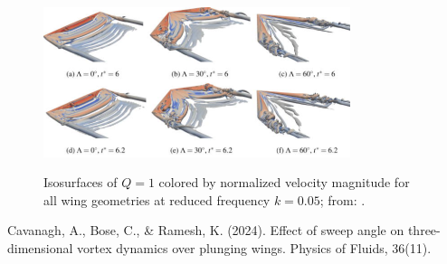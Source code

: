 \documentclass[a4paper,11pt]{article}
\begin{document}
	

\begin{figure}[h]
\centering
\includegraphics[width=0.8\textwidth]{./figure.png}
\label{fig}
\vspace{-0.5cm}
\caption{%
Isosurfaces of $Q = 1$ colored by normalized velocity magnitude for all wing geometries at reduced frequency $k = 0.05$; from: \cite{Cavanagh2024}.}
\end{figure}



\setlength{\bibsep}{.5ex}
%
%
%
% 
%
%
\begin{thebibliography}{999}
%  
 Cavanagh, A., Bose, C., \& Ramesh, K. (2024). Effect of sweep angle on three-dimensional vortex dynamics over plunging wings. Physics of Fluids, 36(11).
%  
\end{thebibliography}
\end{document}
